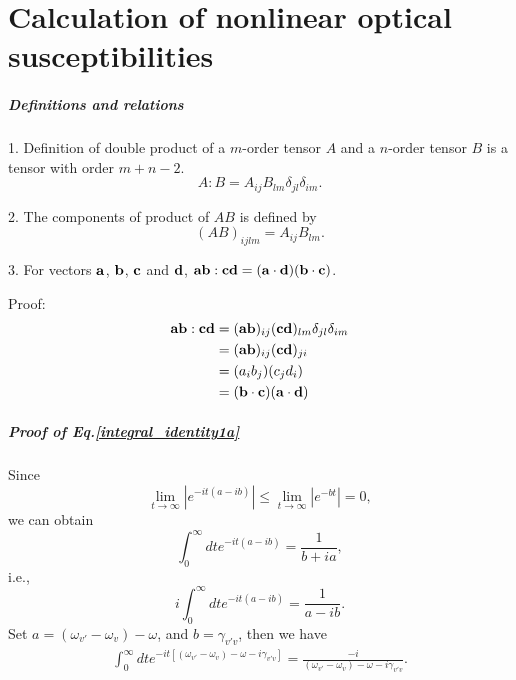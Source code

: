 \chapter{Calculation of nonlinear optical susceptibilities}\label{calculation_of_chi}

\paragraph{Definitions and relations}
1. Definition of double product of a $m$-order tensor $A$ and a $n$-order tensor $B$ is a tensor with order $m+n-2$.
\begin{equation}
    A:B=A_{ij}B_{lm}\delta_{jl}\delta_{im}.
\label{tensor_double_product}
\end{equation}

2. The components of product of $AB$ is defined by 
\begin{equation}
    (AB)_{ijlm}=A_{ij}B_{lm}.
\label{tensor_product}
\end{equation}

3. For vectors $\bf{a}$, $\bf{b}$, $\bf{c}$ and $\bf{d}$, ${\bf{ab}}:{\bf{cd}}=({\bf{a}}\cdot {\bf{d}})({\bf{b}}\cdot{\bf{c}})$.

Proof:
\begin{align}
    {\bf{ab}}:{\bf{cd}}&=({\bf{ab}})_{ij}({\bf{cd}})_{lm}\delta_{jl}\delta_{im} \nonumber \\
    &=({\bf{ab}})_{ij}({\bf{cd}})_{ji} \nonumber\\
    &=(a_i b_j)(c_j d_i) \nonumber\\
    &=({\bf{b}}\cdot{\bf{c}})({\bf{a}}\cdot{\bf{d}})
\end{align}

\paragraph{Proof of Eq.\thinspace\ref{integral_identity1a}}
Since 
\begin{equation}
  \lim_{t\to\infty} |e^{-it(a-ib)}|\le \lim_{t\to\infty} |e^{-bt}| = 0,
  \label{integral_identity0}
\end{equation}
we can obtain
\begin{equation}
  \int_0^\infty dt e^{-it(a-ib)}=\frac{1}{b+ia},
  \label{integral_identity0}
\end{equation}
i.e.,
\begin{equation}
  i\int_0^\infty dt e^{-it(a-ib)}=\frac{1}{a-ib}.
  \label{integral_identity1}
\end{equation}
Set $a = (\omega_{v'} - \omega_{v}) - \omega$, and $b = \gamma_{v'v}$,
then we have
 \begin{align}
 \int_0^\infty dt e^{-it[(\omega_{v'}-\omega_v)-\omega-i\gamma_{v'v}]}=\frac{-i}{(\omega_{v'} -\omega_v)-\omega-i\gamma_{v'v}}.\nonumber
 \end{align}
